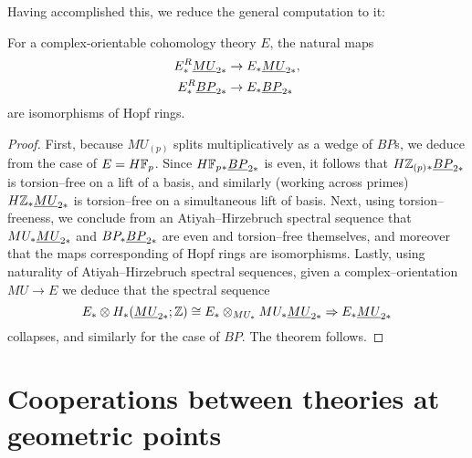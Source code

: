 Having accomplished this, we reduce the general computation to it:

\begin{corollary}
For a complex-orientable cohomology theory $E$, the natural maps
\begin{align*}
E_*^R \underline{\smash{MU}}_{2*} & \to E_* \underline{\smash{MU}}_{2*}, \\
E_*^R \underline{\smash{BP}}_{2*} & \to E_* \underline{\smash{BP}}_{2*}
\end{align*}
are isomorphisms of Hopf rings.
\end{corollary}
\begin{proof}
First, because $MU_{(p)}$ splits multiplicatively as a wedge of $BP$s, we deduce from  the case of $E = H\mathbb F_p$.  Since $H\mathbb F_p{}_* \underline{\smash{BP}}_{2*}$ is even, it follows that $H\mathbb Z_{(p)}{}_* \underline{\smash{BP}}_{2*}$ is torsion--free on a lift of a basis, and similarly (working across primes) $H\mathbb Z_* \underline{\smash{MU}}_{2*}$ is torsion--free on a simultaneous lift of basis.  Next, using torsion--freeness, we conclude from an Atiyah--Hirzebruch spectral sequence that $MU_* \underline{\smash{MU}}_{2*}$ and $BP_* \underline{\smash{BP}}_{2*}$ are even and torsion--free themselves, and moreover that the maps corresponding of Hopf rings are isomorphisms.  Lastly, using naturality of Atiyah--Hirzebruch spectral sequences, given a complex--orientation $MU \to E$ we deduce that the spectral sequence \[E_* \otimes H_*(\underline{\smash{MU}}_{2*}; \mathbb Z) \cong E_* \otimes_{MU_*} MU_* \underline{\smash{MU}}_{2*} \Rightarrow E_* \underline{\smash{MU}}_{2*}\] collapses, and similarly for the case of $BP$.  The theorem follows.
\end{proof}











\section{Cooperations between theories at geometric points}


